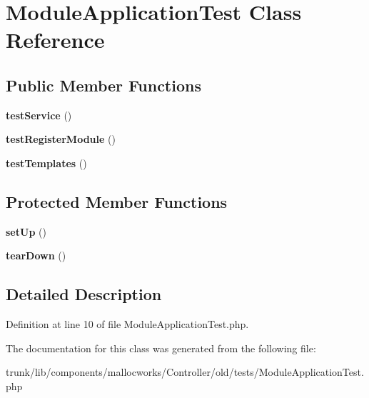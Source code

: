 \hypertarget{class_module_application_test}{
\section{ModuleApplicationTest Class Reference}
\label{class_module_application_test}
}
\subsection*{Public Member Functions}
\begin{DoxyCompactItemize}
\item 
\hypertarget{class_module_application_test_a89f1a3406961a29cfd7c274b062d92eb}{
{\bfseries testService} ()}
\label{class_module_application_test_a89f1a3406961a29cfd7c274b062d92eb}

\item 
\hypertarget{class_module_application_test_aadb36acc88019ce8a5b205a9e576f2bb}{
{\bfseries testRegisterModule} ()}
\label{class_module_application_test_aadb36acc88019ce8a5b205a9e576f2bb}

\item 
\hypertarget{class_module_application_test_a2e231b67ecc63e01d572bab067d7ca74}{
{\bfseries testTemplates} ()}
\label{class_module_application_test_a2e231b67ecc63e01d572bab067d7ca74}

\end{DoxyCompactItemize}
\subsection*{Protected Member Functions}
\begin{DoxyCompactItemize}
\item 
\hypertarget{class_module_application_test_a0bc688732d2b3b162ffebaf7812e78da}{
{\bfseries setUp} ()}
\label{class_module_application_test_a0bc688732d2b3b162ffebaf7812e78da}

\item 
\hypertarget{class_module_application_test_a80fe3d17e658907fc75346a0ec9d6fc7}{
{\bfseries tearDown} ()}
\label{class_module_application_test_a80fe3d17e658907fc75346a0ec9d6fc7}

\end{DoxyCompactItemize}


\subsection{Detailed Description}


Definition at line 10 of file ModuleApplicationTest.php.



The documentation for this class was generated from the following file:\begin{DoxyCompactItemize}
\item 
trunk/lib/components/mallocworks/Controller/old/tests/ModuleApplicationTest.php\end{DoxyCompactItemize}

